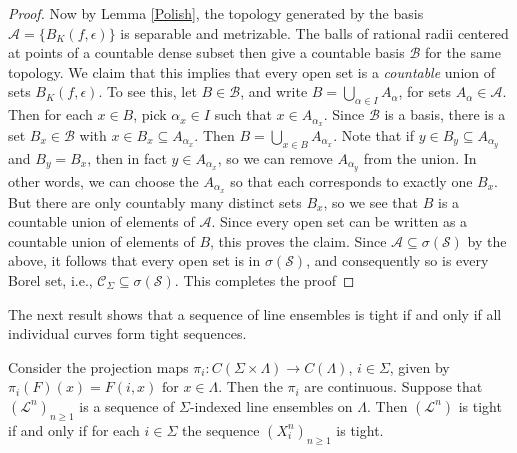 \begin{proof}
	Now by Lemma \ref{Polish}, the topology generated by the basis $\mathcal{A} = \{B_K(f,\epsilon)\}$ is separable and metrizable. The balls of rational radii centered at points of a countable dense subset then give a countable basis $\mathcal{B}$ for the same topology. We claim that this implies that every open set is a \textit{countable} union of sets $B_K(f,\epsilon)$. To see this, let $B\in\mathcal{B}$, and write $B=\bigcup_{\alpha\in I} A_\alpha$, for sets $A_\alpha\in\mathcal{A}$. Then for each $x\in B$, pick $\alpha_x \in I$ such that $x\in A_{\alpha_x}$. Since $\mathcal{B}$ is a basis, there is a set $B_x \in \mathcal{B}$ with $x\in B_x\subseteq A_{\alpha_x}$. Then $B = \bigcup_{x\in B} A_{\alpha_x}$. Note that if $y\in B_y \subseteq A_{\alpha_y}$ and $B_y=B_x$, then in fact $y\in A_{\alpha_x}$, so we can remove $A_{\alpha_y}$ from the union. In other words, we can choose the $A_{\alpha_x}$ so that each corresponds to exactly one $B_x$. But there are only countably many distinct sets $B_x$, so we see that $B$ is a countable union of elements of $\mathcal{A}$. Since every open set can be written as a countable union of elements of $B$, this proves the claim. Since $\mathcal{A}\subseteq\sigma(\mathcal{S})$ by the above, it follows that every open set is in $\sigma(\mathcal{S})$, and consequently so is every Borel set, i.e., $\mathcal{C}_\Sigma \subseteq \sigma(\mathcal{S})$. This completes the proof
	
\end{proof}

The next result shows that a sequence of line ensembles is tight if and only if all individual curves form tight sequences.

\begin{lemma}\label{ProjTight}
	Consider the projection maps $\pi_i: C (\Sigma \times \Lambda) \rightarrow C(\Lambda)$, $i \in \Sigma$, given by
	$\pi_i(F)(x) = F(i, x) \mbox{ for $x \in \Lambda$}.$ Then the $\pi_i$ are continuous. Suppose that $(\mathcal{L}^n)_{n\geq 1}$ is a sequence of $\Sigma$-indexed line ensembles on $\Lambda$. Then $(\mathcal{L}^n)$ is tight if and only if for each $i \in \Sigma$ the sequence $(X_i^n)_{n\geq 1}$ is tight.
	
\end{lemma}

